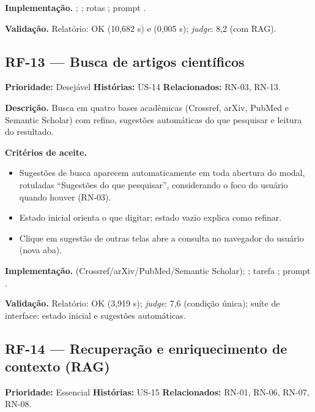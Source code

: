 \textbf{Implementação.} ; \texttt{}; rotas \texttt{}; prompt \texttt{}.

\textbf{Validação.} Relatório: \texttt{} OK (10,682 s) e \texttt{} (0,005 s); \emph{judge}: 8,2 (com RAG).

\subsection{RF-13 --- Busca de artigos científicos}

\textbf{Prioridade:} Desejável \quad \textbf{Histórias:} US-14 \quad \textbf{Relacionados:} RN-03, RN-13.

\textbf{Descrição.} Busca em quatro bases acadêmicas (Crossref, arXiv, PubMed e Semantic Scholar) com refino, sugestões automáticas do que pesquisar e leitura do resultado.

\textbf{Critérios de aceite.}
\begin{itemize}
    \item Sugestões de busca aparecem automaticamente em toda abertura do modal, rotuladas ``Sugestões do que pesquisar'', considerando o foco do usuário quando houver (RN-03).
    \item Estado inicial orienta o que digitar; estado vazio explica como refinar.
    \item Clique em sugestão de outras telas abre a consulta no navegador do usuário (nova aba).
\end{itemize}

\textbf{Implementação.}  (Crossref/arXiv/PubMed/Semantic Scholar); ; tarefa \texttt{}; prompt \texttt{}.

\textbf{Validação.} Relatório: \texttt{} OK (3,919 s); \emph{judge}: 7,6 (condição única); suíte de interface: estado inicial e sugestões automáticas.

\subsection{RF-14 --- Recuperação e enriquecimento de contexto (RAG)}

\textbf{Prioridade:} Essencial \quad \textbf{Histórias:} US-15 \quad \textbf{Relacionados:} RN-01, RN-06, RN-07, RN-08.


